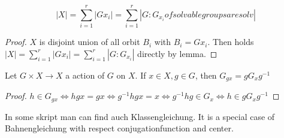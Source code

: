 \begin{theorem}[Bahnengleicung] \label{Bg}
    $$|X| = \sum_{i=1}^r |Gx_i| = \sum_{i=1}^r |G:G_{x_i}of solvable groups are solv|$$
\end{theorem}
\begin{proof}
    \(X\) is disjoint union of all orbit \(B_i\) with \(B_i = Gx_i\). Then holds \(|X| = \sum_{i=1}^r |Gx_i| = \sum_{i=1}^r |G:G_{x_i}|\) directly by lemma.
\end{proof}

\begin{lemma}
    Let $G\times X \to X$ a action of $G$ on $X$. If \(x\in X,  g\in G\), then \(G_{gx} = gG_xg^{-1}\)
\end{lemma}
\begin{proof}
    \(h\in G_{gx}\Leftrightarrow hgx = gx \Leftrightarrow g^{-1}hgx =x\Leftrightarrow g^{-1}hg \in G_x\Leftrightarrow h\in gG_xg^{-1}\)
\end{proof}

\begin{remark}
    In some skript man can find auch Klassengleichung. It is a special case of Bahnengleichung with respect conjugationfunction and center.
\end{remark}